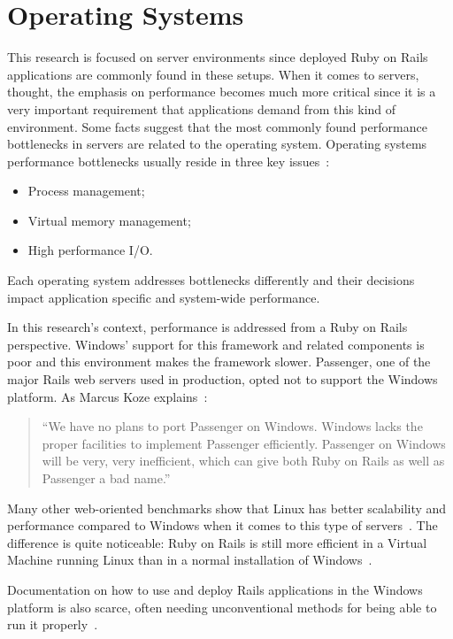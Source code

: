 \section{Operating Systems} %
\label{state:sec:operating_systems}

This research is focused on server environments since deployed Ruby on Rails applications are commonly found in these setups. When it comes to servers, thought, the emphasis on performance becomes much more critical since it is a very important requirement that applications demand from this kind of environment. Some facts suggest that the most commonly found performance bottlenecks in servers are related to the operating system. Operating systems performance bottlenecks usually reside in three key issues~\cite{os_performance_server}:
\begin{itemize}
\item Process management;
\item Virtual memory management;
\item High performance I/O.
\end{itemize}
Each operating system addresses bottlenecks differently and their decisions impact application specific and system-wide performance.

In this research's context, performance is addressed from a Ruby on Rails perspective. Windows' support for this framework and related components is poor and this environment makes the framework slower. Passenger, one of the major Rails web servers used in production, opted not to support the Windows platform. As Marcus Koze explains~\cite{marcus_koze_passenger}:
\begin{quote}
  ``We have no plans to port Passenger on Windows. Windows lacks the proper facilities to implement Passenger efficiently. Passenger on Windows will be very, very inefficient, which can give both Ruby on Rails as well as Passenger a bad name.''
\end{quote}
Many other web-oriented benchmarks show that Linux has better scalability and performance compared to Windows when it comes to this type of servers~\cite{apache_tomcat_performance_linux_windows, php_apache_linux_windows}. The difference is quite noticeable: Ruby on Rails is still more efficient in a Virtual Machine running Linux than in a normal installation of Windows~\cite{linux_virtualbox_windows_rails}.

Documentation on how to use and deploy Rails applications in the Windows platform is also scarce, often needing unconventional methods for being able to run it properly~\cite{rails_windows}.

